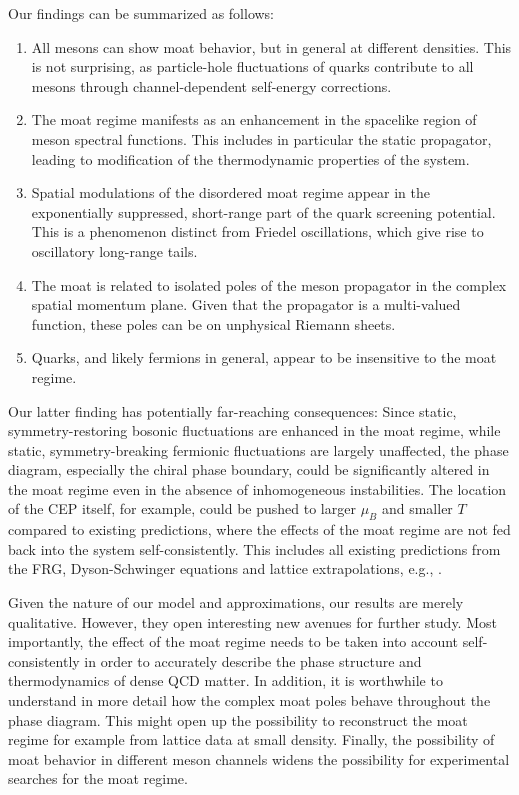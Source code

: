 \documentclass[reprint,english,superscriptaddress,preprintnumbers,amsmath,amssymb,aps,prd]{revtex4-2}
\begin{document}
Our findings can be summarized as follows:
\begin{enumerate}
%
\item All mesons can show moat behavior, but in general at different densities. This is not surprising, as particle-hole fluctuations of quarks contribute to all mesons through channel-dependent self-energy corrections. 
%
\item The moat regime manifests as an enhancement in the spacelike region of meson spectral functions. This includes in particular the static propagator, leading to modification of the thermodynamic properties of the system. 
%
\item Spatial modulations of the disordered moat regime appear in the exponentially suppressed, short-range part of the quark screening potential. This is a phenomenon distinct from Friedel oscillations, which give rise to oscillatory long-range tails. 
%
\item The moat is related to isolated poles of the meson propagator in the complex spatial momentum plane. Given that the propagator is a multi-valued function, these poles can be on unphysical Riemann sheets.
%
\item Quarks, and likely fermions in general, appear to be insensitive to the moat regime.
%
\end{enumerate}
%
Our latter finding has potentially far-reaching consequences: Since static, symmetry-restoring bosonic fluctuations are enhanced in the moat regime, while static, symmetry-breaking fermionic fluctuations are largely unaffected, the phase diagram, especially the chiral phase boundary, could be significantly altered in the moat regime even in the absence of inhomogeneous instabilities. The location of the CEP itself, for example, could be pushed to larger $\mu_B$ and smaller $T$ compared to existing predictions, where the effects of the moat regime are not fed back into the system self-consistently. This includes all existing predictions from the FRG, Dyson-Schwinger equations and lattice extrapolations, e.g., \cite{Fu:2019hdw,Fu:2024rto,Fu:2026qnl, Wang:2026xwa,Gao:2020fbl, Gunkel:2021oya,Lu:2025cls, Basar:2023nkp, Clarke:2024ugt, Shah:2024img, Adam:2025phc}. 

Given the nature of our model and approximations, our results are merely qualitative. However, they open interesting new avenues for further study. Most importantly, the effect of the moat regime needs to be taken into account self-consistently in order to accurately describe the phase structure and thermodynamics of dense QCD matter. In addition, it is worthwhile to understand in more detail how the complex moat poles behave throughout the phase diagram. This might open up the possibility to reconstruct the moat regime for example from lattice data at small density. Finally, the possibility of moat behavior in different meson channels widens the possibility for experimental searches for the moat regime.
 
\end{document}
